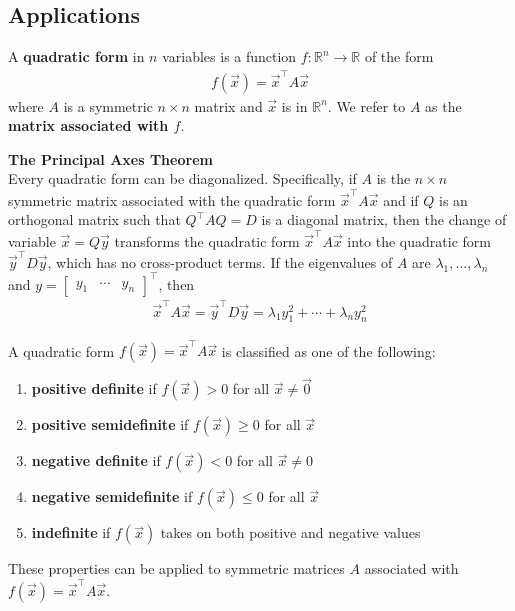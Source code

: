 \documentclass{article}
\begin{document}
\subsection{Applications}
\begin{definition}
    A \textbf{quadratic form} in $n$ variables is a function $f:\mathbb{R}^n\to\mathbb{R}$ of the form
    \begin{align*}
        f(\vec x) = \vec x^\intercal A\vec x
    \end{align*}
    where $A$ is a symmetric $n\times n$ matrix and $\vec x$ is in $\mathbb{R}^n$. We refer to $A$ as the \textbf{matrix associated with $f$}.
\end{definition}
\begin{theorem}
    \textbf{The Principal Axes Theorem}\\
    Every quadratic form can be diagonalized. Specifically, if $A$ is the $n\times n$ symmetric matrix associated with the quadratic form $\vec x^\intercal A\vec x$ and if $Q$ is an orthogonal matrix such that $Q^\intercal AQ=D$ is a diagonal matrix, then the change of variable $\vec x = Q\vec y$ transforms the quadratic form $\vec x^\intercal A\vec x$ into the quadratic form $\vec y^\intercal D\vec y$, which has no cross-product terms.
    If the eigenvalues of $A$ are $\lambda_1, ...,\lambda_n$ and $y=\begin{bmatrix}
            y_1 & \cdots & y_n
        \end{bmatrix}^\intercal $, then
    \begin{align*}
        \vec x^\intercal A\vec x = \vec y^\intercal D\vec y = \lambda_1 y_1^2+\cdots+\lambda_n y_n^2
    \end{align*}
\end{theorem}
\begin{definition}
    A quadratic form $f(\vec x) = \vec x^\intercal A\vec x$ is classified as one of the following:
    \begin{enumerate}
        \item \textbf{positive definite} if $f(\vec x)>0$ for all $\vec x \not= \vec 0$
        \item \textbf{positive semidefinite} if $f(\vec x)\geq 0$ for all $\vec x$
        \item \textbf{negative definite} if $f(\vec x)<0$ for all $\vec x \not= 0$
        \item \textbf{negative semidefinite} if $f(\vec x)\leq 0$ for all $\vec x$
        \item \textbf{indefinite} if $f(\vec x)$ takes on both positive and negative values
    \end{enumerate}
    These properties can be applied to symmetric matrices $A$ associated with $f(\vec x)=\vec x^\intercal A\vec x$.
\end{definition}
\end{document}
